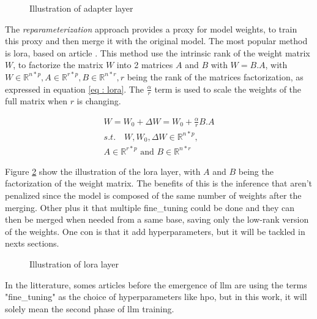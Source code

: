 \begin{figure}[h]
    \centering
    
    \caption{Illustration of adapter layer}
    \label{fig:adapter}
\end{figure}

The \textit{reparameterization} approach provides a proxy for model weights, to train this proxy and then merge it with the original model. The most popular method is \acrfull{lora}, based on article \cite{hu_lora_2021}. This method use the intrinsic rank of the weight matrix $W$, to factorize the matrix $W$ into 2 matrices $A$ and $B$ with $W = B.A$, with $W \in \mathbb{R}^{n*p}, A \in \mathbb{R}^{r*p} , B \in \mathbb{R}^{n*r}, r$ being the rank of the matrices factorization, as expressed in equation \ref{eq : lora}. The $\frac{\alpha}{r}$ term is used to scale the weights of the full matrix when $r$ is changing. 

\begin{equation}
    \begin{split}
    W = W_0 + \Delta W = W_0 + \frac{\alpha}{r} B.A \\
    s.t. \quad W,W_0,\Delta W \in \mathbb{R}^{n*p},\\
    A \in \mathbb{R}^{r*p} \text{ and } B \in \mathbb{R}^{n*r}
    \end{split}
    \label{eq : lora}
\end{equation}

Figure \ref{fig:lora} show the illustration of the \gls{lora} layer, with $A$ and $B$ being the factorization of the weight matrix. The benefits of this is the inference that aren't penalized since the model is composed of the same number of weights after the merging. Other plus it that multiple \gls{fine_tuning} could be done and they can then be merged when needed from a same base, saving only the low-rank version of the weights. One con is that it add hyperparameters, but it will be tackled in nexts sections.

\begin{figure}[h]
    \centering
    
    \caption{Illustration of lora layer}
    \label{fig:lora}
\end{figure}

In the litterature, somes articles before the emergence of \acrshort{llm} are using the terms "\gls{fine_tuning}" as the choice of \glspl{hyperparameter} like \acrfull{hpo}, but in this work, it will solely mean the second phase of \acrshort{llm} training.


